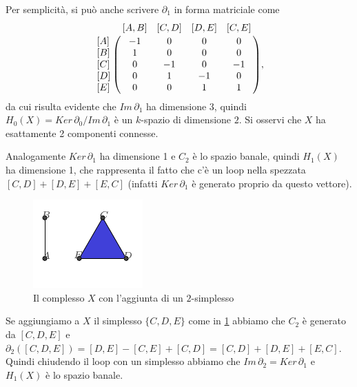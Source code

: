 Per semplicità, si può anche scrivere $\partial_1$ in forma matriciale come
\begin{equation*}
  \bordermatrix{
     & [A,B] & [C,D] & [D,E] & [C,E]\cr
    [A] & -1 & 0 & 0 & 0 \cr
    [B] & 1 & 0 & 0 & 0 \cr
    [C] & 0 & -1 & 0 & -1 \cr
    [D] & 0 & 1 & -1 & 0\cr
    [E] & 0 & 0 & 1 & 1\cr
  },
\end{equation*}
da cui risulta evidente che $Im\,\partial_1$ ha dimensione 3, quindi $H_0(X) = Ker\,\partial_0 / Im\,\partial_1$ è un $k$-spazio di dimensione $2$. Si osservi che $X$ ha esattamente 2 componenti connesse.

Analogamente $Ker\,\partial_1$ ha dimensione 1 e $C_2$ è lo spazio banale, quindi $H_1(X)$ ha dimensione 1, che rappresenta il fatto che c'è un loop nella spezzata $[C,D] + [D,E] + [E,C]$ (infatti $Ker\,\partial_1$ è generato proprio da questo vettore).

\begin{figure}[h]
  \includegraphics[width=.7\linewidth]{gfx/example_homology_loop.pdf}
  \caption{Il complesso $X$ con l'aggiunta di un $2$-simplesso}
  \label{fig:simplicialcomplexloop}
\end{figure}

Se aggiungiamo a $X$ il simplesso $\{C,D,E\}$ come in \cref{fig:simplicialcomplexloop} abbiamo che $C_2$ è generato da $[C,D,E]$ e $\partial_2([C,D,E]) = [D,E] - [C,E] + [C,D] = [C,D] + [D,E] + [E,C]$. Quindi chiudendo il loop con un simplesso abbiamo che
$Im\,\partial_2 = Ker\,\partial_1$ e $H_1(X)$ è lo spazio banale.
